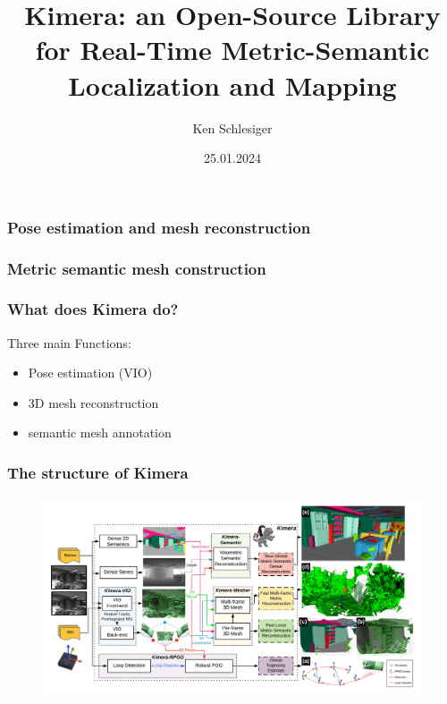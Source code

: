 \documentclass[11pt]{beamer}
\title{Kimera: an Open-Source Library for Real-Time
Metric-Semantic Localization and Mapping}
\author{Ken Schlesiger}
\institute{Universität Würzburg}
\date{25.01.2024}
\begin{document}

\frame[plain]{\titlepage}

\begin{frame}
    \frametitle{Pose estimation and mesh reconstruction} 
    \begin{figure}[ht]
        \centering
    \end{figure}
\end{frame}
\begin{frame}
\frametitle{Metric semantic mesh construction}
    \begin{figure}[ht]
        \centering
    \end{figure}
\end{frame}
\begin{frame}
\frametitle{What does Kimera \cite{rosinol2020kimera} do?}
Three main Functions: 
\begin{itemize}
    \item Pose estimation (VIO) 
    \item 3D mesh reconstruction
    \item semantic mesh annotation
\end{itemize}
\end{frame}
\begin{frame}
\frametitle{The structure of Kimera}
\begin{figure}
    \includegraphics[width=\linewidth]{kimera_chart_23.jpeg} 
\end{figure}
\end{frame}
\end{document}
